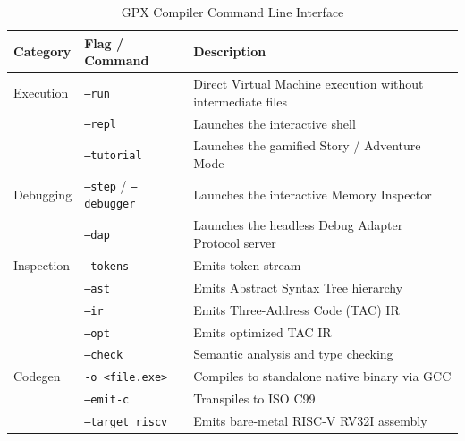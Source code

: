 \documentclass[11pt,a4paper]{report}
\begin{document}
\begin{table}[h]
\centering
\begin{tabular}{llp{7.5cm}}
\toprule
\textbf{Category} & \textbf{Flag / Command} & \textbf{Description} \\
\midrule
Execution & \texttt{--run} & Direct Virtual Machine execution without intermediate files \\
          & \texttt{--repl} & Launches the interactive shell \\
          & \texttt{--tutorial} & Launches the gamified Story / Adventure Mode \\
\midrule
Debugging & \texttt{--step} / \texttt{--debugger} & Launches the interactive Memory Inspector \\
          & \texttt{--dap} & Launches the headless Debug Adapter Protocol server \\
\midrule
Inspection& \texttt{--tokens} & Emits token stream \\
          & \texttt{--ast} & Emits Abstract Syntax Tree hierarchy \\
          & \texttt{--ir} & Emits Three-Address Code (TAC) IR \\
          & \texttt{--opt} & Emits optimized TAC IR \\
          & \texttt{--check} & Semantic analysis and type checking \\
\midrule
Codegen   & \texttt{-o <file.exe>} & Compiles to standalone native binary via GCC \\
          & \texttt{--emit-c} & Transpiles to ISO C99 \\
          & \texttt{--target riscv} & Emits bare-metal RISC-V RV32I assembly \\
\bottomrule
\end{tabular}
\caption{GPX Compiler Command Line Interface}
\end{table}
\end{document}
